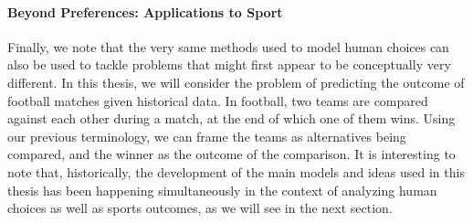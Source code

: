 \paragraph{Beyond Preferences: Applications to Sport}
Finally, we note that the very same methods used to model human choices can also be used to tackle problems that might first appear to be conceptually very different.
In this thesis, we will consider the problem of predicting the outcome of football matches given historical data.
In football, two teams are compared against each other during a match, at the end of which one of them wins.
Using our previous terminology, we can frame the teams as alternatives being compared, and the winner as the outcome of the comparison.
It is interesting to note that, historically, the development of the main models and ideas used in this thesis has been happening simultaneously in the context of analyzing human choices as well as sports outcomes, as we will see in the next section.
